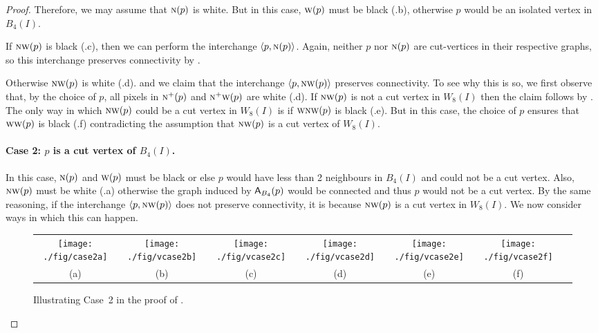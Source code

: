 \documentclass[lotsofwhite,charterfonts]{patmorin}
\newcommand{\N}{\textsc{n}}
\newcommand{\W}{\textsc{w}}
\newcommand{\NW}{\textsc{nw}}
\newcommand{\ic}[2]{\langle #1,#2 \rangle}
\newcommand{\A}[2]{\ensuremath{\protect\textup{\textsf{A}}_{#2}(#1)}}
\begin{document}
\begin{proof}
Therefore, we may assume that $\N(p)$ is white.  But in this case,
$\W(p)$ must be black (.b), otherwise $p$ would be an isolated vertex in $B_4(I)$.

If $\NW(p)$ is black (.c), then we can perform the
interchange $\ic{p}{\N(p)}$.  Again, neither $p$ nor $\N(p)$ are
cut-vertices in their respective graphs, so this interchange preserves
connectivity by .

Otherwise $\NW(p)$ is white (.d). and we claim that
the interchange $\ic{p}{\NW(p)}$ preserves connectivity. To see
why this is so, we first observe that, by the choice of $p$, all
pixels in $\N^+(p)$ and $\N^+\W(p)$ are white (.d). If $\NW(p)$ is not a cut vertex in $W_8(I)$ then the claim follows by .  The only way in which $\NW(p)$ could be a cut vertex in $W_8(I)$ is if $\W\NW(p)$ is black (.e). But in this case, the choice of $p$ ensures that $\W\W(p)$ is black (.f) contradicting the assumption that  $\NW(p)$ is a cut vertex of $W_8(I)$.

\paragraph{Case 2: $p$ is a cut vertex of $B_4(I)$.} In this case,
$\N(p)$ and $\W(p)$ must be black or else $p$ would have less than
2 neighbours in $B_4(I)$ and could not be a cut vertex.  Also,
$\NW(p)$ must be white (.a) otherwise the graph induced by \A{p}{B_4} would be connected and thus $p$ would not be a cut vertex. By the same reasoning, if the interchange $\ic{p}{\NW(p)}$ does not preserve connectivity, it is because $\NW(p)$ is a cut vertex in $W_8(I)$.  We now consider ways in which this can happen.

\begin{figure}[htbp]
\begin{center}
\begin{tabular}{ccccccc}
\texttt{[image: ./fig/case2a]} & 
\texttt{[image: ./fig/vcase2b]} & 
\texttt{[image: ./fig/vcase2c]} & 
\texttt{[image: ./fig/vcase2d]} & 
\texttt{[image: ./fig/vcase2e]} & 
\texttt{[image: ./fig/vcase2f]} \\
(a) & (b) & (c) & (d) & (e) & (f)
\end{tabular}
\end{center}
\caption{Illustrating Case~2 in the proof of .}
\end{figure}


\end{proof}
\end{document}
